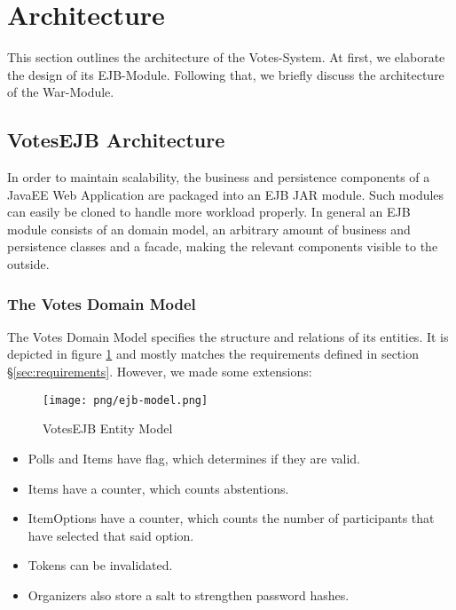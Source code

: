 \section{Architecture}
\label{sec:architecture}
This section outlines the architecture of the Votes-System.
At first, we elaborate the design of its EJB-Module.
Following that, we briefly discuss the architecture of the War-Module.


\subsection{VotesEJB Architecture}
\label{subsec:votesejb-architector}
In order to maintain scalability, the business and persistence components of a JavaEE Web Application are packaged into an EJB JAR module.
Such modules can easily be cloned to handle more workload properly.
In general an EJB module consists of an domain model, an arbitrary amount of business and persistence classes and a facade, making the relevant components visible to the outside.

\subsubsection{The Votes Domain Model}
\label{subsubsec:the-votes-domain-model}
The Votes Domain Model specifies the structure and relations of its entities.
It is depicted in figure \ref{figure:ejb-model} and mostly matches the requirements defined in section §\ref{sec:requirements}.
However, we made some extensions:

\begin{figure}[h]
\centering
\texttt{[image: png/ejb-model.png]}
\caption{VotesEJB Entity Model}
\label{figure:ejb-model}
\end{figure}

\begin{itemize}

\item
Polls and Items have flag, which determines if they are valid.

\item
Items have a counter, which counts abstentions.

\item
ItemOptions have a counter, which counts the number of participants that have selected that said option.

\item
Tokens can be invalidated.

\item
Organizers also store a salt to strengthen password hashes.

\end{itemize}



